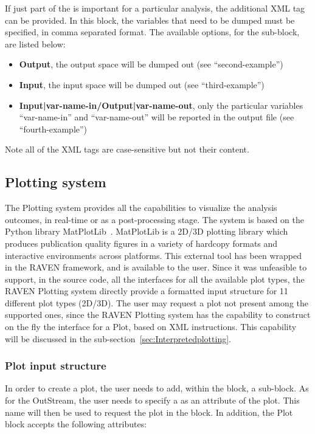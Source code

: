 If just part of the  is important for a particular analysis, the
additional XML tag  can be provided.
%
In this block, the variables that need to be dumped must be specified, in
comma separated format.
%
The available options, for the  sub-block, are listed below:
\vspace{-5mm}
\begin{itemize}
  \itemsep0em
  \item \textbf{Output}, the output space will be dumped out (see
  ``second-example'')
  \item \textbf{Input}, the input space will be dumped out (see
  ``third-example'')
  \item \textbf{Input|var-name-in/Output|var-name-out}, only the particular
  variables ``var-name-in'' and ``var-name-out'' will be reported in the output
  file (see ``fourth-example'')
\end{itemize}
\vspace{-5mm}
Note all of the XML tags are case-sensitive but not their content.
%
%
\subsection{Plotting system \label{sec:plotting}}
The Plotting system provides all the capabilities to visualize the analysis
outcomes, in real-time or as a post-processing stage.
%
The system is based on the Python library MatPlotLib~\cite{MatPlotLib}.
%
MatPlotLib is a 2D/3D plotting library which produces publication quality
figures in a variety of hardcopy formats and interactive environments across
platforms.
%
This external tool has been wrapped in the RAVEN framework, and is available to
the user.
%
Since it was unfeasible to support, in the source code, all the interfaces for
all the available plot types, the RAVEN Plotting system directly provide a
formatted input structure for 11 different plot types (2D/3D).
%
The user may request a plot not present among the supported ones, since the
RAVEN Plotting system has the capability to construct on the fly the interface
for a Plot, based on XML instructions.
%
This capability will be discussed in the
sub-section~\ref{sec:Interpretedplotting}.
%
\subsubsection{Plot input structure \label{sec:PlotInputStructure}}
In order to create a plot, the user needs to add, within the
 block, a  sub-block.
%
As for the  OutStream, the user needs to specify a 
 as an attribute of the plot.
%
This name will then be used to request the plot in the  block.
%
In addition, the Plot block accepts the following attributes:

